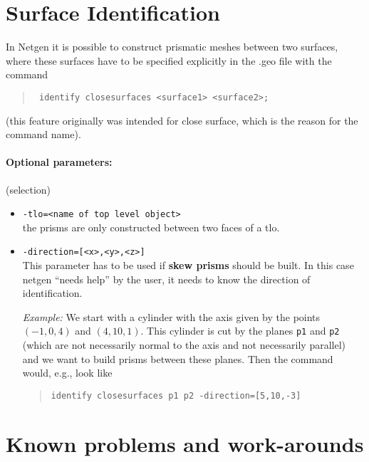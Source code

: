 \documentclass[12pt]{book}
\begin{document}
\section{Surface Identification}
In Netgen it is possible to construct prismatic meshes between two surfaces, where these surfaces
have to be specified explicitly in the .geo file with the command
\begin{quote}
  \tt
  identify closesurfaces <surface1> <surface2>;
\end{quote}
(this feature originally was intended for close surface, which is the reason for the command name).
\paragraph{Optional parameters:} (selection)
\begin{itemize}
\item \texttt{-tlo=<name of top level object>}\\
the prisms are only constructed between two faces of a tlo.
\item \texttt{-direction=[<x>,<y>,<z>]}\\
This parameter has to be used if \textbf{skew prisms} should be built. In this case netgen ``needs help'' by the user,
it needs to know the direction of identification.

\textit{Example:} We start with a cylinder with the axis given by the points $(-1,0,4)$ and $(4,10,1)$. This cylinder
is cut by the planes \texttt{p1} and \texttt{p2} (which are not necessarily normal to the axis and not necessarily parallel)
and we want to build prisms between
these planes. Then the command would, e.g., look like
\begin{quote}
\tt identify closesurfaces p1 p2 -direction=[5,10,-3]
\end{quote}
\end{itemize}







\section{Known problems and work-arounds}
\end{document}
